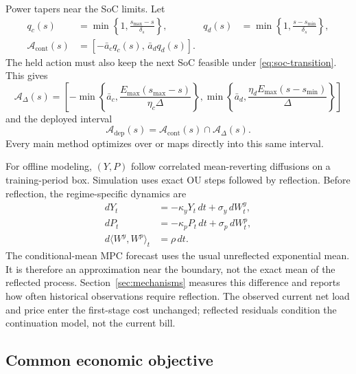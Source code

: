 \documentclass[preprint,11pt]{elsarticle}
\newcommand{\cA}{\mathcal{A}}
\theoremstyle{plain}
\theoremstyle{remark}
\begin{document}
Power tapers near the SoC limits. Let
\begin{align}
 q_c(s)&=\min\left\{1,\frac{s_{\max}-s}{\delta_s}\right\}, &
 q_d(s)&=\min\left\{1,\frac{s-s_{\min}}{\delta_s}\right\},\\
 \cA_{\mathrm{cont}}(s)
   &=\left[-\bar a_cq_c(s),\,\bar a_dq_d(s)\right].
\end{align}
The held action must also keep the next SoC feasible under
\eqref{eq:soc-transition}. This gives
\begin{equation}
 \cA_{\Delta}(s)=\left[
 -\min\left\{\bar a_c,\frac{E_{\max}(s_{\max}-s)}{\eta_c\Delta}\right\},
 \min\left\{\bar a_d,\frac{\eta_dE_{\max}(s-s_{\min})}{\Delta}\right\}
 \right]
\end{equation}
and the deployed interval
\begin{equation}
 \cA_{\mathrm{dep}}(s)=\cA_{\mathrm{cont}}(s)\cap\cA_{\Delta}(s).
 \label{eq:deployed-set}
\end{equation}
Every main method optimizes over or maps directly into this same interval.

For offline modeling, $(Y,P)$ follow correlated mean-reverting diffusions on
a training-period box. Simulation uses exact OU steps followed by reflection.
Before reflection, the regime-specific dynamics are
\begin{equation}
 \begin{aligned}
 dY_t&=-\kappa_yY_t\,dt+\sigma_y\,dW_t^y,\\
 dP_t&=-\kappa_pP_t\,dt+\sigma_p\,dW_t^p,\\
 d\langle W^y,W^p\rangle_t&=\rho\,dt.
 \end{aligned}
 \label{eq:ou-model}
\end{equation}
The conditional-mean MPC forecast uses the usual unreflected exponential mean.
It is therefore an approximation near the boundary, not the exact mean of the
reflected process. Section~\ref{sec:mechanisms} measures this difference and
reports how often historical observations require reflection.
The observed current net load and price enter the first-stage cost unchanged;
reflected residuals condition the continuation model, not the current bill.

\subsection{Common economic objective}
\end{document}
